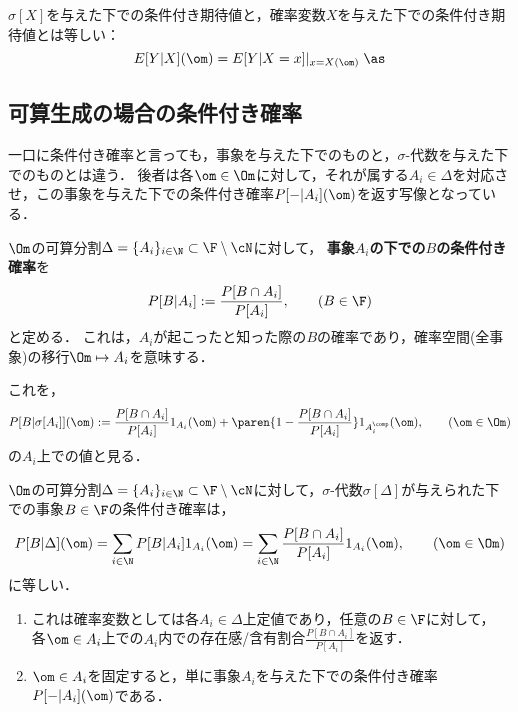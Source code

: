 \documentclass[uplatex,dvipdfmx]{jsreport}
\begin{document}
\begin{proposition}
    $\sigma[X]$を与えた下での条件付き期待値と，確率変数$X$を与えた下での条件付き期待値とは等しい：
    \[E[Y|X](\om)=E[Y|X=x]|_{x=X(\om)}\;\as\]
\end{proposition}

\subsection{可算生成の場合の条件付き確率}

\begin{tcolorbox}[colframe=ForestGreen, colback=ForestGreen!10!white,breakable,colbacktitle=ForestGreen!40!white,coltitle=black,fonttitle=\bfseries\sffamily,
title=]
    一口に条件付き確率と言っても，事象を与えた下でのものと，$\sigma$-代数を与えた下でのものとは違う．
    後者は各$\om\in\Om$に対して，それが属する$A_i\in\Delta$を対応させ，この事象を与えた下での条件付き確率$P[-|A_i](\om)$を返す写像となっている．
\end{tcolorbox}

\begin{definition}
    $\Om$の可算分割$\Delta=\{A_i\}_{i\in\N}\subset\F\setminus\cN$に対して，
    \textbf{事象$A_i$の下での$B$の条件付き確率}を
    \[P[B|A_i]:=\frac{P[B\cap A_i]}{P[A_i]},\qquad(B\in\F)\]
    と定める．
    これは，$A_i$が起こったと知った際の$B$の確率であり，確率空間(全事象)の移行$\Om\mapsto A_i$を意味する．
\end{definition}
\begin{remarks}[事象を与えた下での条件付き確率の意味]
    これを，
    \[P[B|\sigma[A_i]](\om):=\frac{P[B\cap A_i]}{P[A_i]}1_{A_i}(\om)+\paren{1-\frac{P[B\cap A_i]}{P[A_i]}}1_{A_i^\comp}(\om),\qquad(\om\in\Om)\]
    の$A_i$上での値と見る．
\end{remarks}

\begin{proposition}
    $\Om$の可算分割$\Delta=\{A_i\}_{i\in\N}\subset\F\setminus\cN$に対して，$\sigma$-代数$\sigma[\Delta]$が与えられた下での事象$B\in\F$の条件付き確率は，
    \[P[B|\Delta](\om)=\sum_{i\in\N}P[B|A_i]1_{A_i}(\om)=\sum_{i\in\N}\frac{P[B\cap A_i]}{P[A_i]}1_{A_i}(\om),\qquad(\om\in\Om)\]
    に等しい．
\end{proposition}
\begin{remarks}\mbox{}
    \begin{enumerate}
        \item これは確率変数としては各$A_i\in\Delta$上定値であり，任意の$B\in\F$に対して，
        各$\om\in A_i$上での$A_i$内での存在感/含有割合$\frac{P[B\cap A_i]}{P[A_i]}$を返す．
        \item $\om\in A_i$を固定すると，単に事象$A_i$を与えた下での条件付き確率$P[-|A_i](\om)$である．
    \end{enumerate}
\end{remarks}
\end{document}
